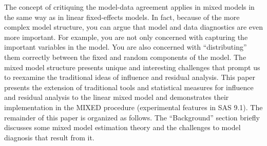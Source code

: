 \documentclass[MAIN.tex]{subfiles}
\begin{document}
The concept of critiquing the model-data agreement applies in mixed models in the same way as in linear
fixed-effects models. In fact, because of the more complex model structure, you can argue that model and
data diagnostics are even more important. For example, you are not only concerned with capturing the
important variables in the model. You are also concerned with “distributing” them correctly between the
fixed and random components of the model. The mixed model structure presents unique and interesting
challenges that prompt us to reexamine the traditional ideas of influence and residual analysis.
This paper presents the extension of traditional tools and statistical measures for influence and residual
analysis to the linear mixed model and demonstrates their implementation in the MIXED procedure (experimental
features in SAS 9.1). The remainder of this paper is organized as follows. The “Background” section
briefly discusses some mixed model estimation theory and the challenges to model diagnosis that result
from it.



















\end{document}
